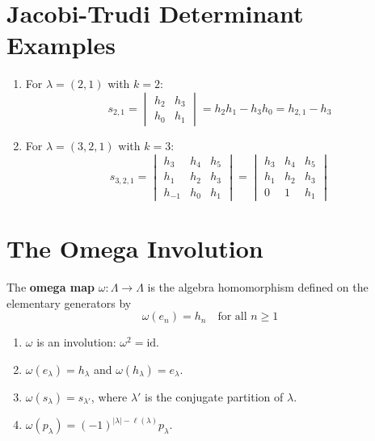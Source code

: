 \documentclass[12pt]{memoir}
\begin{document}
\newpage

\section{Jacobi-Trudi Determinant Examples}

\begin{ptcb}
\begin{Ex}
\begin{enumerate}
    \item For $\lambda = (2,1)$ with $k=2$:
    \[
    s_{2,1} = \begin{vmatrix} h_2 & h_3 \\ h_0 & h_1 \end{vmatrix} = h_2 h_1 - h_3 h_0 = h_{2,1} - h_3
    \]
    \item For $\lambda = (3,2,1)$ with $k=3$:
    \[
    s_{3,2,1} = \begin{vmatrix}
    h_3 & h_4 & h_5 \\
    h_1 & h_2 & h_3 \\
    h_{-1} & h_0 & h_1
    \end{vmatrix}
    = \begin{vmatrix}
    h_3 & h_4 & h_5 \\
    h_1 & h_2 & h_3 \\
    0 & 1 & h_1
    \end{vmatrix}
    \]
\end{enumerate}
\end{Ex}
\end{ptcb}

\newpage

\section{The Omega Involution}

\begin{ptcb}
\begin{Def}
The \textbf{omega map} $\omega: \Lambda \to \Lambda$ is the algebra homomorphism defined on the elementary generators by
\[
\omega(e_n) = h_n \quad \text{for all } n \ge 1
\]
\end{Def}
\end{ptcb}

\begin{ptcb}
\begin{Prop}
\begin{enumerate}
    \item $\omega$ is an involution: $\omega^2 = \text{id}$.
    \item $\omega(e_\lambda) = h_\lambda$ and $\omega(h_\lambda) = e_\lambda$.
    \item $\omega(s_\lambda) = s_{\lambda'}$, where $\lambda'$ is the conjugate partition of $\lambda$.
    \item $\omega(p_\lambda) = (-1)^{|\lambda| - \ell(\lambda)} p_\lambda$.
\end{enumerate}
\end{Prop}
\end{ptcb}
\end{document}
